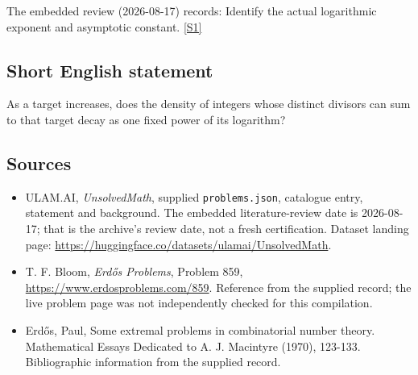 \documentclass[11pt,a4paper]{article}
\newcommand{\sref}[2]{\hyperlink{source:#1:#2}{[S#2]}}
\begin{document}
The embedded review (2026-08-17) records: Identify the actual logarithmic exponent and asymptotic constant. \sref{statement}{1}

\subsection{Short English statement}

As a target increases, does the density of integers whose distinct divisors can sum to that target decay as one fixed power of its logarithm?

\subsection{Sources}

{\small

\begin{itemize}

\item[\hypertarget{source:statement:1}{S1}] ULAM.AI, \emph{UnsolvedMath}, supplied \texttt{problems.json}, catalogue entry, statement and background. The embedded literature-review date is 2026-08-17; that is the archive’s review date, not a fresh certification. Dataset landing page: \url{https://huggingface.co/datasets/ulamai/UnsolvedMath}.

\item[\hypertarget{source:statement:2}{S2}] T. F. Bloom, \emph{Erdős Problems}, Problem 859, \url{https://www.erdosproblems.com/859}. Reference from the supplied record; the live problem page was not independently checked for this compilation.

\item[\hypertarget{source:statement:3}{S3}] Erd\H{o}s, Paul, Some extremal problems in combinatorial number theory. Mathematical Essays Dedicated to A. J. Macintyre (1970), 123-133. Bibliographic information from the supplied record.

\end{itemize}

}

\label{end:statement}
\end{document}
